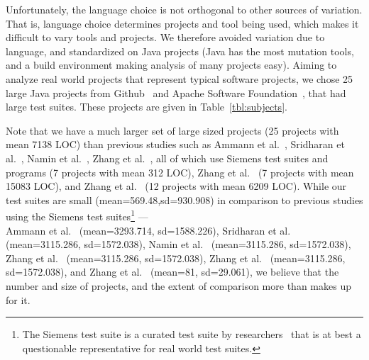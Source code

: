 \documentclass[conference]{IEEEtran}
\begin{document}
Unfortunately, the language choice is not orthogonal to other sources of
variation. That is, language choice determines projects and tool being
used, which makes it difficult to vary tools and projects. We
therefore avoided variation due to language, and
standardized on Java projects (Java has the most mutation tools, and a
build environment making analysis of many projects easy). Aiming to analyze real world projects that
represent typical software projects, we chose 25 large Java
projects from Github~\cite{github} and Apache Software Foundation~\cite{apache},
that had large test suites. These projects are given in Table~\ref{tbl:subjects}.




Note that we have a much larger set of large sized projects
(25 projects with  mean
7138 LOC) than previous studies
such as Ammann et al.~\cite{ammann2014establishing},
Sridharan et al.~\cite{sridharan2010prioritizing},
Namin et al.~\cite{siami2008sufficient},
Zhang et al.~\cite{zhang2010isoperator}, all of which use Siemens test
suites and programs (7 projects with  mean
312 LOC),
Zhang et al.~\cite{zhang2013operator} (7
projects with  mean 15083 LOC), and
Zhang et al.~\cite{zhang2014empirical} (12
projects with mean 6209 LOC).
While our test suites are small
(mean=569.48,sd=930.908)
in comparison to previous studies using the Siemens test
suites\footnote{The Siemens test suite is a curated test suite by
researchers~\cite{untch2009onreduced} that is at best a questionable
representative for real world test suites.} ---\\
Ammann et al.~\cite{ammann2014establishing} (mean=3293.714, sd=1588.226),
Sridharan et al.~\cite{sridharan2010prioritizing} (mean=3115.286, sd=1572.038),
Namin et al.~\cite{siami2008sufficient} (mean=3115.286, sd=1572.038),
Zhang et al.~\cite{zhang2010isoperator} (mean=3115.286, sd=1572.038),
Zhang et al.~\cite{zhang2013operator} (mean=3115.286, sd=1572.038), and
Zhang et al.~\cite{zhang2014empirical} (mean=81, sd=29.061),
we believe that the number and size of projects, and the extent of comparison more than makes up for it.
\end{document}
